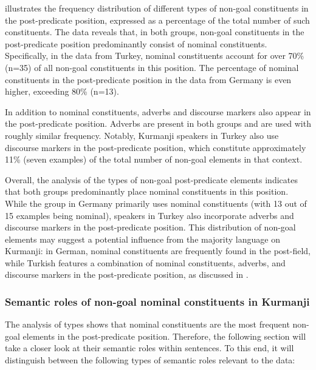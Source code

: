  illustrates the frequency distribution of different types of non-goal constituents in the post-predicate position, expressed as a percentage of the total number of such constituents. The data reveals that, in both groups, non-goal constituents in the post-predicate position predominantly consist of nominal constituents. Specifically, in the data from Turkey, nominal constituents account for over 70\% (n=35) of all non-goal constituents in this position. The percentage of nominal constituents in the post-predicate position in the data from Germany is even higher, exceeding 80\% (n=13).

In addition to nominal constituents, adverbs and discourse markers also appear in the post-predicate position. Adverbs are present in both groups and are used with roughly similar frequency. Notably, Kurmanji speakers in Turkey also use discourse markers in the post-predicate position, which constitute approximately 11\% (seven examples) of the total number of non-goal elements in that context.

Overall, the analysis of the types of non-goal post-predicate elements indicates that both groups predominantly place nominal constituents in this position. While the group in Germany primarily uses nominal constituents (with 13 out of 15 examples being nominal), speakers in Turkey also incorporate adverbs and discourse markers in the post-predicate position. This distribution of non-goal elements may suggest a potential influence from the majority language on Kurmanji: in German, nominal constituents are frequently found in the post-field, while Turkish features a combination of nominal constituents, adverbs, and discourse markers in the post-predicate position, as discussed in .

\subsubsection{Semantic roles of non-goal nominal constituents in Kurmanji}\label{sec:key:6.3.6.3}

The analysis of types shows that nominal constituents are the most frequent non-goal elements in the post-predicate position. Therefore, the following section will take a closer look at their semantic roles within sentences. To this end, it will distinguish between the following types of semantic roles relevant to the data:

